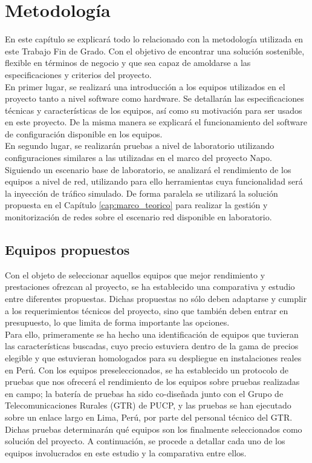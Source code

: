 \chapter{Metodología}
\label{cap:metodologia}
En este capítulo se explicará todo lo relacionado con la metodología utilizada en este Trabajo Fin de Grado. Con el objetivo de encontrar una solución sostenible, flexible en términos de negocio y que sea capaz de amoldarse a las especificaciones y criterios del proyecto.\\

En primer lugar, se realizará una introducción a los equipos utilizados en el proyecto tanto a nivel software como hardware. Se detallarán las especificaciones técnicas y características de los equipos, así como su motivación para ser usados en este proyecto. De la misma manera se explicará el funcionamiento del software de configuración disponible en los equipos.\\

En segundo lugar, se realizarán pruebas a nivel de laboratorio utilizando configuraciones similares a las utilizadas en el marco del proyecto Napo. Siguiendo un escenario base de laboratorio, se analizará el rendimiento de los equipos a nivel de red, utilizando para ello herramientas cuya funcionalidad será la inyección de tráfico simulado. De forma paralela se utilizará la solución propuesta en el Capítulo \ref{cap:marco_teorico} para realizar la gestión y monitorización de redes sobre el escenario red disponible en laboratorio.

\section{Equipos propuestos}
Con el objeto de seleccionar aquellos equipos que mejor rendimiento y prestaciones ofrezcan al proyecto, se ha establecido una comparativa y estudio entre diferentes propuestas. Dichas propuestas no sólo deben adaptarse y cumplir a los requerimientos técnicos del proyecto, sino que también deben entrar en presupuesto, lo que limita de forma importante las opciones.\\

Para ello, primeramente se ha hecho una identificación de equipos que tuvieran las características buscadas, cuyo precio estuviera dentro de la gama de precios elegible y que estuvieran homologados para su despliegue en instalaciones reales en Perú. Con los equipos preseleccionados, se ha establecido un protocolo de pruebas que nos ofrecerá el rendimiento de los equipos sobre pruebas realizadas en campo; la batería de pruebas ha sido co-diseñada junto con el Grupo de Telecomunicaciones Rurales (GTR) de PUCP, y las pruebas se han ejecutado sobre un enlace largo en Lima, Perú, por parte del personal técnico del GTR. Dichas pruebas determinarán qué equipos son los finalmente seleccionados como solución del proyecto. A continuación, se procede a detallar cada uno de los equipos involucrados en este estudio y la comparativa entre ellos.

